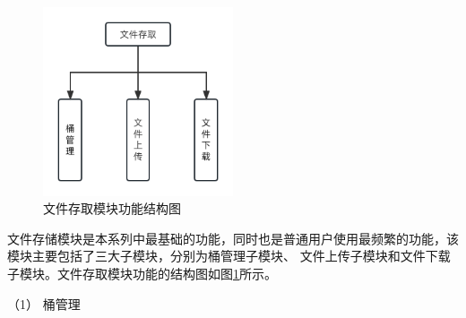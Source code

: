 \begin{figure}[h]
    \centering
    \includegraphics[width=0.5\textwidth]{my_figures/chapter4/文件存取模块功能结构图.png}
    \caption{文件存取模块功能结构图}
    \label{fig:文件存取模块功能结构图}
\end{figure}

文件存储模块是本系列中最基础的功能，同时也是普通用户使用最频繁的功能，该模块主要包括了三大子模块，分别为桶管理子模块、
文件上传子模块和文件下载子模块。文件存取模块功能的结构图如图\ref{fig:文件存取模块功能结构图}所示。



（1） 桶管理



